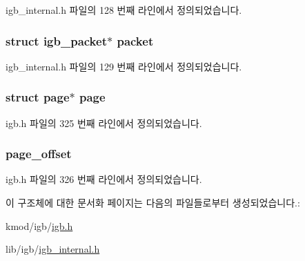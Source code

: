 igb\+\_\+internal.\+h 파일의 128 번째 라인에서 정의되었습니다.

\subsubsection[{\texorpdfstring{packet}{packet}}]{\setlength{\rightskip}{0pt plus 5cm}struct {\bf igb\+\_\+packet}$\ast$ packet}\hypertarget{structigb__rx__buffer_ac6186670bb595d9f22c89b6dc2779d14}{}\label{structigb__rx__buffer_ac6186670bb595d9f22c89b6dc2779d14}


igb\+\_\+internal.\+h 파일의 129 번째 라인에서 정의되었습니다.

\subsubsection[{\texorpdfstring{page}{page}}]{\setlength{\rightskip}{0pt plus 5cm}struct page$\ast$ page}\hypertarget{structigb__rx__buffer_ad45c9283ecdd581420d88bc33100364a}{}\label{structigb__rx__buffer_ad45c9283ecdd581420d88bc33100364a}


igb.\+h 파일의 325 번째 라인에서 정의되었습니다.

\subsubsection[{\texorpdfstring{page\+\_\+offset}{page_offset}}]{ page\+\_\+offset}\hypertarget{structigb__rx__buffer_a4dde6949f38b527769892127f2e372d2}{}\label{structigb__rx__buffer_a4dde6949f38b527769892127f2e372d2}


igb.\+h 파일의 326 번째 라인에서 정의되었습니다.



이 구조체에 대한 문서화 페이지는 다음의 파일들로부터 생성되었습니다.\+:\begin{DoxyCompactItemize}
\item 
kmod/igb/\hyperlink{kmod_2igb_2igb_8h}{igb.\+h}\item 
lib/igb/\hyperlink{igb__internal_8h}{igb\+\_\+internal.\+h}\end{DoxyCompactItemize}
